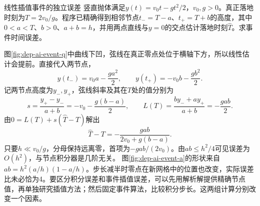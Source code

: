 \begin{example}线性插值事件的独立误差
竖直抛体满足$y(t)=v_0t-gt^2/2$，$v_0,g>0$。真正落地时刻为$T=2v_0/g$。程序已精确得到相邻节点$t_-=T-a$、$t_+=T+b$的高度，其中$0<a<T$、$b>0$、$a+b=h$，并用两点直线与$y=0$的交点估计落地时刻$\widehat T$。求事件时间误差。
\end{example}
\begin{solution}
图\ref{fig:dep-ai-event-q}中曲线下凹，弦线在真正零点处位于横轴下方，所以线性估计会提前。直接代入两节点，
\[
 y(t_-)=v_0a-\frac{ga^2}{2},\qquad
 y(t_+)=-v_0b-\frac{gb^2}{2}.
\]
记两节点高度为$y_-,y_+$，弦线斜率及其在$T$处的值分别为
\[
s=\frac{y_+-y_-}{a+b}=-v_0-\frac{g(b-a)}2,\qquad
L(T)=\frac{b y_-+a y_+}{a+b}=-\frac{gab}{2}.
\]
由$0=L(T)+s(\widehat T-T)$解出
\[
 \widehat T-T=-\frac{gab}{2v_0+g(b-a)}.
\]
只要$h\ll v_0/g$，分母保持远离零，首项为$-gab/(2v_0)$。由$ab\leq h^2/4$可见误差为$O(h^2)$，与节点积分器是几阶无关。
图\ref{fig:dep-ai-event-a}的形状来自$ab=h^2(a/h)(1-a/h)$。步长减半时零点在新网格中的位置也改变，实际误差比未必恰为4。要区分积分误差和事件插值误差，可以先用解析解提供精确节点值，再单独研究插值方法；然后固定事件算法，比较积分步长。这两组计算分别改变一个因素。
\end{solution}


